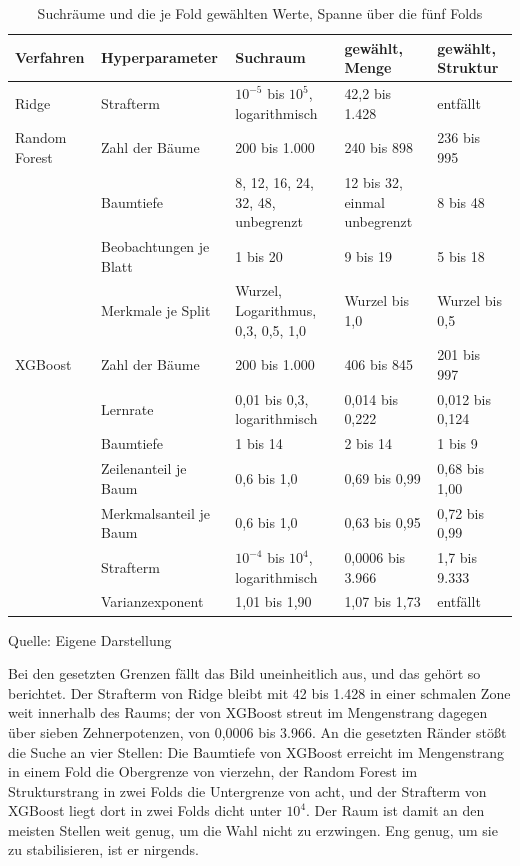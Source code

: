 \documentclass[12pt,a4paper]{article}
\renewcommand{\footnotesize}{\fontsize{10pt}{12pt}\selectfont}
\newcommand{\tabformat}{%
  \centering
  \singlespacing
  \footnotesize
  \setlength{\tabcolsep}{5pt}%
  \renewcommand{\arraystretch}{1.15}%
}
\newcommand{\tabquelle}[1][Eigene Darstellung]{%
  \par\setlength{\parskip}{0pt}\vspace{3pt}%
  {\setstretch{1}\fontsize{9pt}{11pt}\selectfont\raggedright Quelle: #1\par}%
}
\begin{document}
\begin{table}[htbp]
\tabformat
\caption{Suchräume und die je Fold gewählten Werte, Spanne über die fünf Folds}
\label{tab:suchraeume}
\begin{tabularx}{\textwidth}{@{}L{2.0cm} L{2.9cm} Y L{2.9cm} L{2.5cm}@{}}
\toprule
\textbf{Verfahren} & \textbf{Hyperparameter} & \textbf{Suchraum} & \textbf{gewählt, Menge} & \textbf{gewählt, Struktur} \\
\midrule
Ridge & Strafterm & $10^{-5}$ bis $10^{5}$, logarithmisch & 42,2 bis 1.428 & entfällt \\
\addlinespace
Random Forest & Zahl der Bäume & 200 bis 1.000 & 240 bis 898 & 236 bis 995 \\
 & Baumtiefe & 8, 12, 16, 24, 32, 48, unbegrenzt & 12 bis 32, einmal unbegrenzt & 8 bis 48 \\
 & Beobachtungen je Blatt & 1 bis 20 & 9 bis 19 & 5 bis 18 \\
 & Merkmale je Split & Wurzel, Logarithmus, 0,3, 0,5, 1,0 & Wurzel bis 1,0 & Wurzel bis 0,5 \\
\addlinespace
XGBoost & Zahl der Bäume & 200 bis 1.000 & 406 bis 845 & 201 bis 997 \\
 & Lernrate & 0,01 bis 0,3, logarithmisch & 0,014 bis 0,222 & 0,012 bis 0,124 \\
 & Baumtiefe & 1 bis 14 & 2 bis 14 & 1 bis 9 \\
 & Zeilenanteil je Baum & 0,6 bis 1,0 & 0,69 bis 0,99 & 0,68 bis 1,00 \\
 & Merkmalsanteil je Baum & 0,6 bis 1,0 & 0,63 bis 0,95 & 0,72 bis 0,99 \\
 & Strafterm & $10^{-4}$ bis $10^{4}$, logarithmisch & 0,0006 bis 3.966 & 1,7 bis 9.333 \\
 & Varianzexponent & 1,01 bis 1,90 & 1,07 bis 1,73 & entfällt \\
\bottomrule
\end{tabularx}
\tabquelle
\end{table}

Bei den gesetzten Grenzen fällt das Bild uneinheitlich aus, und das gehört so
berichtet. Der Strafterm von Ridge bleibt mit 42 bis 1.428 in einer schmalen
Zone weit innerhalb des Raums; der von XGBoost streut im Mengenstrang dagegen
über sieben Zehnerpotenzen, von 0,0006 bis 3.966. An die gesetzten Ränder stößt
die Suche an vier Stellen: Die Baumtiefe von XGBoost erreicht im Mengenstrang
in einem Fold die Obergrenze von vierzehn, der Random Forest im Strukturstrang
in zwei Folds die Untergrenze von acht, und der Strafterm von XGBoost liegt dort
in zwei Folds dicht unter $10^{4}$. Der Raum ist damit an den meisten Stellen
weit genug, um die Wahl nicht zu erzwingen. Eng genug, um sie zu stabilisieren,
ist er nirgends.
\end{document}

